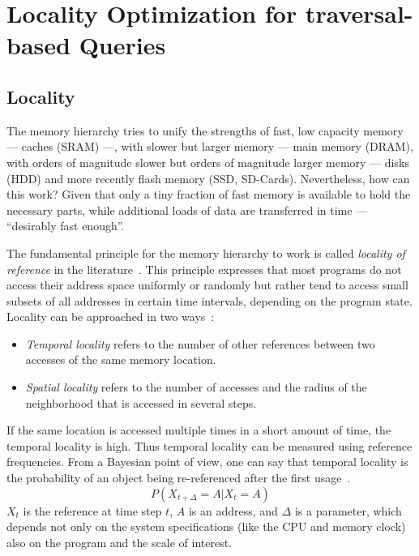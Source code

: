 \chapter{Locality Optimization for traversal-based Queries}\label{\positionnumber}
\section{Locality}\label{\positionnumber}
    The memory hierarchy tries to unify the strengths of fast, low capacity memory --- caches (SRAM) ---, with slower but larger memory --- main memory (DRAM), with orders of magnitude slower but orders of magnitude larger memory --- disks (HDD) and more recently flash memory (SSD, SD-Cards).
    Nevertheless, how can this work? 
    Given that only a tiny fraction of fast memory is available to hold the necessary parts, while additional loads of data are transferred in time --- ``desirably fast enough''.
    
    The fundamental principle for the memory hierarchy to work is called \textit{locality of reference} in the literature~\autocite{jacob2010memory, tanenbaum2015modern}. 
    This principle expresses that most programs do not access their address space uniformly or randomly but rather tend to access small subsets of all addresses in certain time intervals, depending on the program state.
    Locality can be approached in two ways~\autocite{denning2006locality}: 
    
    \begin{itemize}
     \item \textit{Temporal locality} refers to the number of other references between two accesses of the same memory location. 
     \item \textit{Spatial locality} refers to the number of accesses and the radius of the neighborhood that is accessed in several steps.
    \end{itemize}
    
    If the same location is accessed multiple times in a short amount of time, the temporal locality is high.
    Thus temporal locality can be measured using reference frequencies.
    From a Bayesian point of view, one can say that temporal locality is the probability of an object being re-referenced after the first usage~\autocite{gupta2013locality}. 
    \[ P (X_{t + \Delta} = A | X_t = A) \]
    $X_t$ is the reference at time step $t$, $A$ is an address, and $\Delta$ is a parameter, which depends not only on the system specifications (like the CPU and memory clock) also on the program and the scale of interest.
    
